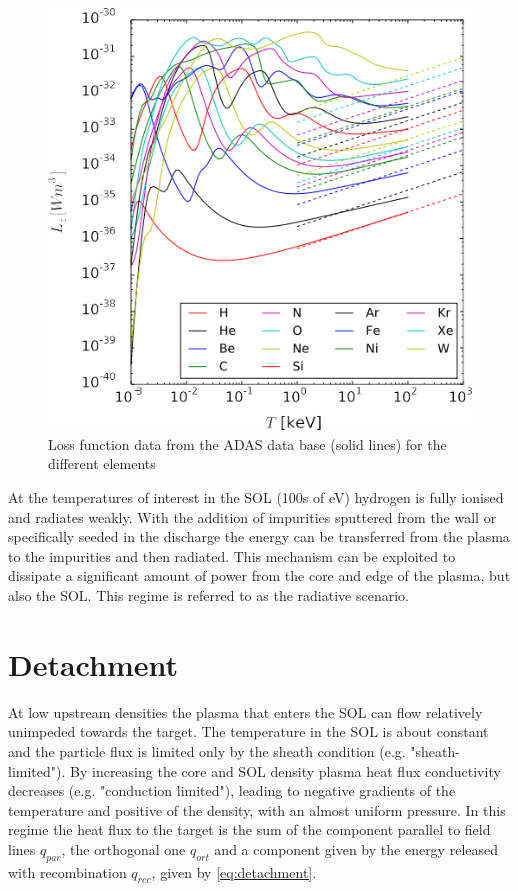 \begin{figure}
	\centering
	\includegraphics[width=\linewidth]{Chapters/chapter1/figs/loss curve.png}
	\caption{Loss function data from the ADAS data base (solid lines) for the different elements \cite{Lux2015}}
	\label{fig:loss_curve}
\end{figure}

At the temperatures of interest in the SOL (100s of eV\cite{Pacher2011}) hydrogen is fully ionised and radiates weakly. With the addition of impurities sputtered from the wall or specifically seeded in the discharge the energy can be transferred from the plasma to the impurities and then radiated. This mechanism can be exploited to dissipate a significant amount of power from the core and edge of the plasma, but also the SOL. This regime is referred to as the radiative scenario.


\section{Detachment}\label{Detachment}

At low upstream densities the plasma that enters the SOL can flow relatively unimpeded towards the target. The temperature in the SOL is about constant and the particle flux is limited only by the sheath condition (e.g. "sheath-limited"). By increasing the core and SOL density plasma heat flux conductivity decreases (e.g. "conduction limited"), leading to negative gradients of the temperature and positive of the density, with an almost uniform pressure. In this regime the heat flux to the target is the sum of the component parallel to field lines $q_{par}$, the orthogonal one $q_{ort}$ and a component given by the energy released with recombination $q_{rec}$, given by  \autoref{eq:detachment}.

